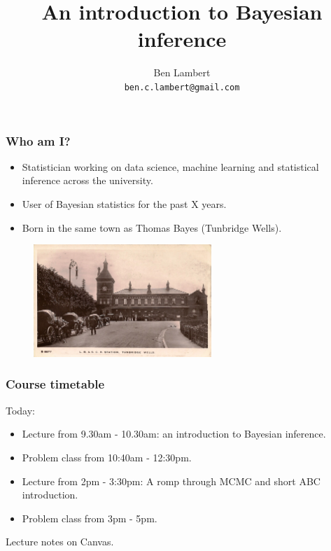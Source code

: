 \documentclass[handout]{beamer}
\title{An introduction to Bayesian inference}
\author[Ben Lambert]{Ben Lambert\inst{1}\\ \texttt{ben.c.lambert@gmail.com}}
\date{}
\institute[University of Oxford]{
\inst{1}University of Oxford}
\begin{document}
\begin{frame}
\titlepage
\end{frame}

\begin{frame}
	\frametitle{Who am I?}
	\begin{itemize}
		\item Statistician working on data science, machine learning and statistical inference across the university.
		\item User of Bayesian statistics for the past X years.
		\item Born in the same town as Thomas Bayes (Tunbridge Wells).
	\end{itemize}
	
	\begin{figure}[ht]
		\centerline{\includegraphics[width=0.6\textwidth]{./animations_figures/tunbridgeWells.jpg}}
	\end{figure}
	
\end{frame}

\begin{frame}
	\frametitle{Course timetable}
	
	Today:
	
	\begin{itemize}
		\item<2-> Lecture from 9.30am - 10.30am: an introduction to Bayesian inference.
		\item<3-> Problem class from 10:40am - 12:30pm.
		\item<4-> Lecture from 2pm - 3:30pm: A romp through MCMC and short ABC introduction.
		\item<5-> Problem class from 3pm - 5pm.
	\end{itemize}
	
	Lecture notes on Canvas.
	
\end{frame}
\end{document}
